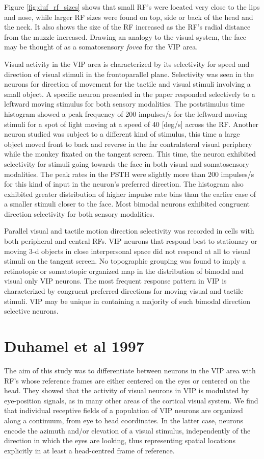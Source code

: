 \documentclass[10pt,oneside,final]{article}
\begin{document}
        Figure \ref{fig:duf_rf_sizes} shows that small RF's were located very close to the lips and nose, while larger RF sizes were found on top, side or back of the head and the neck. It also shows the size of the RF increased as the RF's radial distance from the muzzle increased. Drawing an analogy to the visual system, the face may be thought of as a somatosensory \textit{fovea} for the VIP area. 

        Visual activity in the VIP area is characterized by its selectivity for speed and direction of visual stimuli in the frontoparallel plane. Selectivity was seen in the neurons for direction of movement for the tactile and visual stimuli involving a small object. A specific neuron presented in the paper responded selectively to a leftward moving stimulus for both sensory modalities. The poststimulus time histogram showed a peak frequency of 200 impulses/s for the leftward moving stimuli for a spot of light moving at a speed of 40 [deg/s] across the RF. Another neuron studied was subject to a different kind of stimulus, this time a large object moved front to back and reverse in the far contralateral visual periphery while the monkey fixated on the tangent screen. This time, the neuron exhibited selectivity for stimuli going towards the face in both visual and somatosensory modalities. The peak rates in the PSTH were slightly more than 200 impulses/s for this kind of input in the neuron's preferred direction. The histogram also exhibited greater distribution of higher impulse rate bins than the earlier case of a smaller stimuli closer to the face. Most bimodal neurons exhibited congruent direction selectivity for both sensory modalities. 

        Parallel visual and tactile motion direction selectivity was recorded in cells with both peripheral and central RFs. VIP neurons that respond best to stationary or moving 3-d objects in close interpersonal space did not respond at all to visual stimuli on the tangent screen. No topographic grouping was found to imply a retinotopic or somatotopic organized map in the distribution of bimodal and visual only VIP neurons. The most frequent response pattern in VIP is characterized by congruent preferred directions for moving visual and tactile stimuli. VIP may be unique in containing a majority of such bimodal direction selective neurons.
    \section{Duhamel et al 1997}
        The aim of this study was to differentiate between neurons in the VIP area with RF's whose reference frames are either centered on the eyes or centered on the head. They showed that the activity of visual neurons in VIP is modulated by eye-position signals, as in many other areas of the cortical visual system. We find that individual receptive fields of a population of VIP neurons are organized along a continuum, from eye to head coordinates. In the latter case, neurons encode the azimuth and/or elevation of a visual stimulus, independently of the direction in which the eyes are looking, thus representing spatial locations explicitly in at least a head-centred frame of reference\cite{Duhamel1997}.
\end{document}
